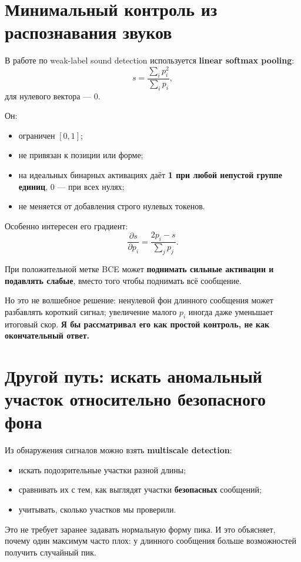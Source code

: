 \documentclass[a4paper,11pt]{article}
\begin{document}
\section{Минимальный контроль из распознавания звуков}

В работе по weak-label sound detection используется \textbf{linear softmax pooling}:
\[
  s=\frac{\sum_i p_i^2}{\sum_i p_i},
\]
для нулевого вектора --- 0.

Он:
\begin{itemize}
  \item ограничен $[0,1]$;
  \item не привязан к позиции или форме;
  \item на идеальных бинарных активациях даёт \textbf{1 при любой непустой группе
    единиц}, 0 --- при всех нулях;
  \item не меняется от добавления строго нулевых токенов.
\end{itemize}

Особенно интересен его градиент:
\[
  \frac{\partial s}{\partial p_i}
  =\frac{2p_i-s}{\sum_j p_j}.
\]

При положительной метке BCE может \textbf{поднимать сильные активации и подавлять
слабые}, вместо того чтобы поднимать всё сообщение.

Но это не волшебное решение: ненулевой фон длинного сообщения может разбавлять
короткий сигнал; увеличение малого $p_i$ иногда даже уменьшает итоговый скор.
\textbf{Я бы рассматривал его как простой контроль, не как окончательный ответ.}

\section{Другой путь: искать аномальный участок относительно безопасного фона}

Из обнаружения сигналов можно взять \textbf{multiscale detection}:
\begin{itemize}
  \item искать подозрительные участки разной длины;
  \item сравнивать их с тем, как выглядят участки \textbf{безопасных} сообщений;
  \item учитывать, сколько участков мы проверили.
\end{itemize}

Это не требует заранее задавать нормальную форму пика. И это объясняет, почему
один максимум часто плох: у длинного сообщения больше возможностей получить
случайный пик.
\end{document}
